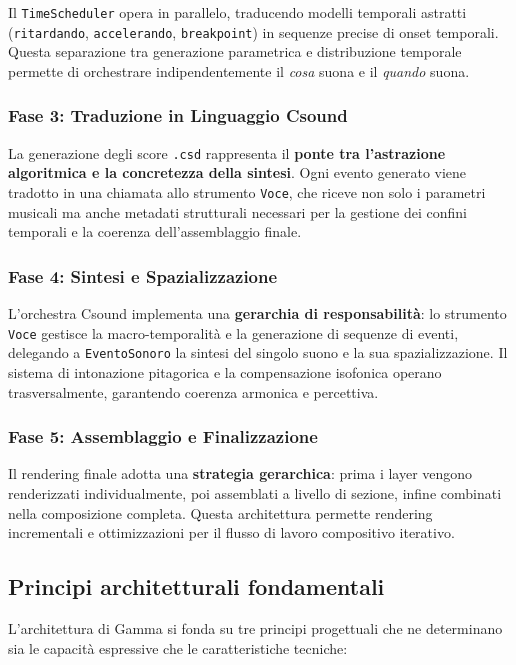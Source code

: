 Il \texttt{TimeScheduler} opera in parallelo, traducendo modelli temporali astratti (\texttt{ritardando}, \texttt{accelerando}, \texttt{breakpoint}) in sequenze precise di onset temporali. Questa separazione tra generazione parametrica e distribuzione temporale permette di orchestrare indipendentemente il \emph{cosa} suona e il \emph{quando} suona.

\subsubsection{Fase 3: Traduzione in Linguaggio Csound}
La generazione degli score \texttt{.csd} rappresenta il \textbf{ponte tra l'astrazione algoritmica e la concretezza della sintesi}. Ogni evento generato viene tradotto in una chiamata allo strumento \texttt{Voce}, che riceve non solo i parametri musicali ma anche metadati strutturali necessari per la gestione dei confini temporali e la coerenza dell'assemblaggio finale.

\subsubsection{Fase 4: Sintesi e Spazializzazione}
L'orchestra Csound implementa una \textbf{gerarchia di responsabilità}: lo strumento \texttt{Voce} gestisce la macro-temporalità e la generazione di sequenze di eventi, delegando a \texttt{EventoSonoro} la sintesi del singolo suono e la sua spazializzazione. Il sistema di intonazione pitagorica e la compensazione isofonica operano trasversalmente, garantendo coerenza armonica e percettiva.

\subsubsection{Fase 5: Assemblaggio e Finalizzazione}
Il rendering finale adotta una \textbf{strategia gerarchica}: prima i layer vengono renderizzati individualmente, poi assemblati a livello di sezione, infine combinati nella composizione completa. Questa architettura permette rendering incrementali e ottimizzazioni per il flusso di lavoro compositivo iterativo.

\subsection{Principi architetturali fondamentali}

L'architettura di Gamma si fonda su tre principi progettuali che ne determinano sia le capacità espressive che le caratteristiche tecniche:

